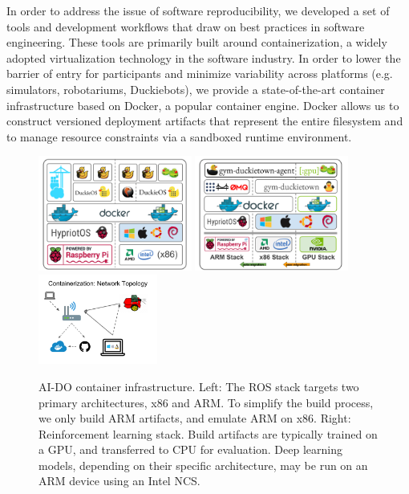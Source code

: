 \documentclass[12pt,initial,twoside,maitrise]{dms}
\numberwithin{equation}{section}
\numberwithin{table}{chapter}
\numberwithin{figure}{chapter}
\begin{document}
In order to address the issue of software reproducibility, we developed a set of tools and development workflows that draw on best practices in software engineering. These tools are primarily built around containerization, a widely adopted virtualization technology in the software industry. In order to lower the barrier of entry for participants and minimize variability across platforms (e.g. simulators, robotariums, Duckiebots), we provide a state-of-the-art container infrastructure based on Docker, a popular container engine. Docker allows us to construct versioned deployment artifacts that represent the entire filesystem and to manage resource constraints via a sandboxed runtime environment.

\begin{figure}[ht]
    \centering
    \includegraphics[width=0.45\textwidth]{docker_stack_1.png}
    \includegraphics[width=0.45\textwidth]{docker_stack_2.png}
    \includegraphics[width=0.35\textwidth]{network_infra.png}
    \caption{AI-DO container infrastructure. Left: The ROS stack targets two primary architectures, x86 and ARM. To simplify the build process, we only build ARM artifacts, and emulate ARM on x86. Right: Reinforcement learning stack. Build artifacts are typically trained on a GPU, and transferred to CPU for evaluation. Deep learning models, depending on their specific architecture, may be run on an ARM device using an Intel NCS.}
    \label{fig:docker}
\end{figure}
\end{document}
